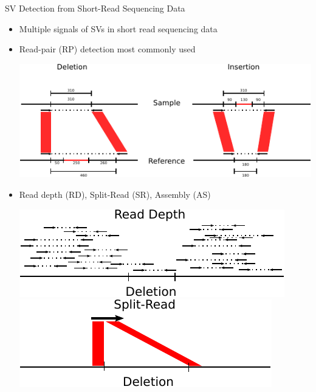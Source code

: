 \documentclass{beamer}
\begin{document}
\begin{frame}{SV Detection from Short-Read Sequencing Data}
\begin{itemize}
  \item Multiple signals of SVs in short read sequencing data
  \item Read-pair (RP) detection most commonly used
\begin{center}
     \includegraphics[height=.3\textheight]{rp_signatures_opaque.pdf}
\end{center}
  \item Read depth (RD), Split-Read (SR), Assembly (AS)
\vspace{1mm}
\begin{center}
     \includegraphics[width=.4\textwidth]{rd.pdf}\hspace{2mm}\includegraphics[width=.4\textwidth]{sr.pdf}
\end{center}
\end{itemize}
\end{frame}

\end{document}
